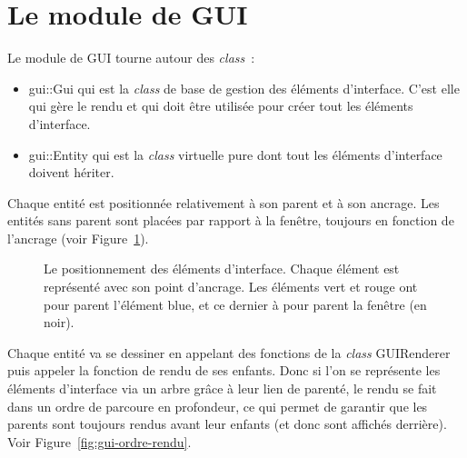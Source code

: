 \documentclass[10pt, french, a4paper]{report}
\newcommand{\class}[1]{{\codefont \NoAutoSpacing \mbox{#1}}}
\begin{document}


\section{Le module de GUI}

Le module de GUI tourne autour des \textit{class}~:
\begin{itemize}
	\item \class{gui::Gui} qui est la \textit{class} de base de gestion des 
	      éléments d'interface. C'est elle qui gère le rendu et qui doit être
	      utilisée pour créer tout les éléments d'interface.
	\item \class{gui::Entity} qui est la \textit{class} virtuelle pure dont tout
		  les éléments d'interface doivent hériter.
\end{itemize}

Chaque entité est positionnée relativement à son parent et à son ancrage. 
Les entités sans parent sont placées par rapport à la fenêtre, toujours en fonction
de l'ancrage (voir Figure~\ref{fig:gui-positionement}).

\begin{figure}[h]
	\center
	\caption{Le positionnement des éléments d'interface. Chaque élément est représenté avec son point d'ancrage. Les éléments vert et rouge ont pour parent l'élément blue, et ce dernier à pour parent la fenêtre (en noir).}
	\label{fig:gui-positionement}
\end{figure}

Chaque entité va se dessiner en appelant des fonctions de la \textit{class} 
\class{GUIRenderer} puis appeler la fonction de rendu de ses enfants.
Donc si l'on se représente les éléments d'interface via un arbre grâce à leur
lien de parenté, le rendu se fait dans un ordre de parcoure en profondeur, ce
qui permet de garantir que les parents sont toujours rendus avant leur enfants (et donc sont affichés derrière). Voir Figure~\ref{fig:gui-ordre-rendu}.
\end{document}
